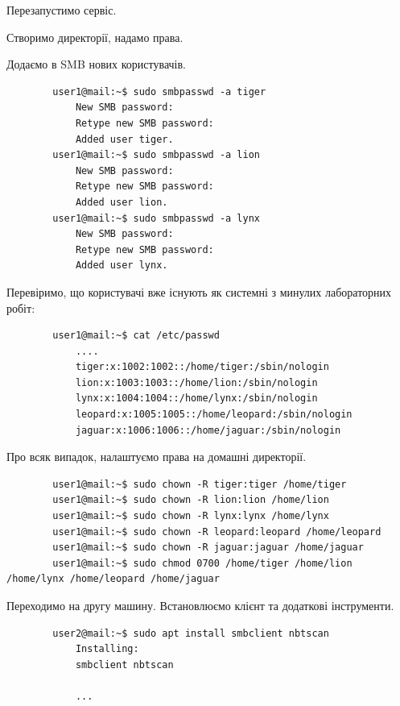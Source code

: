 \documentclass[14pt, a4paper]{extreport}
\begin{document}
	\pagebreak
	
	Перезапустимо сервіс. \sideat{[VM 1]}
	
	
	Створимо директорії, надамо права. \sideat{[VM 1]}
	
	
	Додаємо в SMB нових користувачів. \sideat{[VM 1]}
	
	\begin{verbatim}
		user1@mail:~$ sudo smbpasswd -a tiger
			New SMB password:
			Retype new SMB password:
			Added user tiger.
		user1@mail:~$ sudo smbpasswd -a lion
			New SMB password:
			Retype new SMB password:
			Added user lion.
		user1@mail:~$ sudo smbpasswd -a lynx
			New SMB password:
			Retype new SMB password:
			Added user lynx.
	\end{verbatim}
	
	Перевіримо, що користувачі вже існують як системні з минулих лабораторних робіт: \sideat{[VM 1]}
	
	\begin{verbatim}
		user1@mail:~$ cat /etc/passwd
			....
			tiger:x:1002:1002::/home/tiger:/sbin/nologin
			lion:x:1003:1003::/home/lion:/sbin/nologin
			lynx:x:1004:1004::/home/lynx:/sbin/nologin
			leopard:x:1005:1005::/home/leopard:/sbin/nologin
			jaguar:x:1006:1006::/home/jaguar:/sbin/nologin
	\end{verbatim}
	
	Про всяк випадок, налаштуємо права на домашні директорії. \sideat{[VM 1]}
	
	\begin{verbatim}
		user1@mail:~$ sudo chown -R tiger:tiger /home/tiger
		user1@mail:~$ sudo chown -R lion:lion /home/lion
		user1@mail:~$ sudo chown -R lynx:lynx /home/lynx
		user1@mail:~$ sudo chown -R leopard:leopard /home/leopard
		user1@mail:~$ sudo chown -R jaguar:jaguar /home/jaguar
		user1@mail:~$ sudo chmod 0700 /home/tiger /home/lion /home/lynx /home/leopard /home/jaguar
	\end{verbatim}
	
	Переходимо на другу машину. Встановлюємо клієнт та додаткові інструменти. \sideat{[VM 2]}
	
	\begin{verbatim}
		user2@mail:~$ sudo apt install smbclient nbtscan
			Installing:                     
			smbclient nbtscan
		
			...
	\end{verbatim}
	
\end{document}
